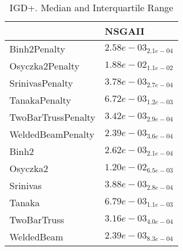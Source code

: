 \documentclass{article}
\begin{document}
\begin{table}
\caption{IGD+. Median and Interquartile Range}
\label{table: IGD+}
\centering
\begin{scriptsize}
\begin{tabular}{ll}
\hline &  NSGAII\\
\hline 
Binh2Penalty & \cellcolor{gray95}$  2.58e-03_{ 2.1e-04}$ \\
Osyczka2Penalty & \cellcolor{gray95}$  1.88e-02_{ 1.1e-02}$ \\
SrinivasPenalty & \cellcolor{gray95}$  3.78e-03_{ 2.7e-04}$ \\
TanakaPenalty & \cellcolor{gray95}$  6.72e-03_{ 1.2e-03}$ \\
TwoBarTrussPenalty & \cellcolor{gray95}$  3.42e-03_{ 2.9e-04}$ \\
WeldedBeamPenalty & \cellcolor{gray95}$  2.39e-03_{ 3.6e-04}$ \\
Binh2 & \cellcolor{gray95}$  2.62e-03_{ 2.1e-04}$ \\
Osyczka2 & \cellcolor{gray95}$  1.20e-02_{ 6.5e-03}$ \\
Srinivas & \cellcolor{gray95}$  3.88e-03_{ 2.8e-04}$ \\
Tanaka & \cellcolor{gray95}$  6.79e-03_{ 1.1e-03}$ \\
TwoBarTruss & \cellcolor{gray95}$  3.16e-03_{ 4.0e-04}$ \\
WeldedBeam & \cellcolor{gray95}$  2.39e-03_{ 8.3e-04}$ \\
\hline
\end{tabular}
\end{scriptsize}
\end{table}
\end{document}
